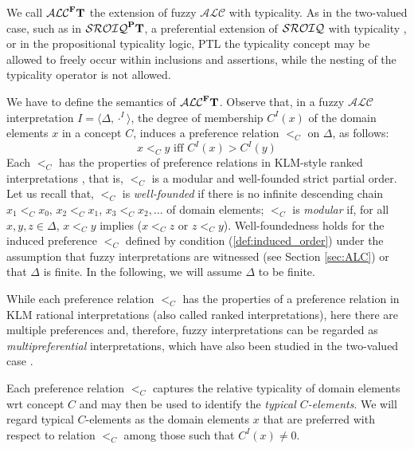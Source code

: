 \documentclass[runningheads]{llncs}
\newcommand{\tip}{{\bf T}}
\newcommand{\alc}{\mathcal{ALC}}
\newcommand{\sroiqpt}{\mathcal{SROIQ}^{\Pe}\tip}
\newcommand{\alcFt}{\mathcal{ALC}^{\Fe}\tip}
\newcommand {\Fe} {{\bf F}}
\newcommand {\Pe} {{\bf P}}
\begin{document}
We call $\alcFt$ the extension of fuzzy $\alc$ with typicality.
As in the two-valued case,  
such as in  $\sroiqpt$, a  preferential extension of ${\cal SROIQ}$ with typicality \cite{ISMIS2015},  or in the propositional typicality logic, PTL \cite{BoothCasiniAIJ19} 
the typicality concept may be allowed to freely occur within inclusions and assertions, while the nesting of the typicality operator is not allowed.

We have to define the semantics of $\alcFt$.
Observe that, in a fuzzy $\alc$ interpretation $I= \langle \Delta, \cdot^I \rangle$, the degree of membership $C^I(x)$ of the domain elements $x$ in a concept $C$, induces a preference relation $<_C$ on $\Delta$, as follows:
\begin{equation}\label{def:induced_order}
x <_C y \mbox{ iff } C^I(x) > C^I(y)
\end{equation}
Each $<_{C}$ has the properties of preference relations in KLM-style ranked interpretations \cite{whatdoes}, that is,  $<_{C}$ is a modular and well-founded strict partial order. 
Let us recall that, $<_{C}$ is {\em well-founded} 
if there is no infinite descending chain $x_1 <_C x_0$, $x_2 <_C x_1$, $x_3 <_C x_2, \ldots $ of domain elements;
    $<_{C}$ is {\em modular} if,
for all $x,y,z \in \Delta$, $x <_{C} y$ implies ($x <_{C} z$ or $z <_{C} y$).
Well-foundedness holds for the induced preference $<_C$ defined by condition (\ref{def:induced_order}) under the assumption that  fuzzy interpretations are witnessed \cite{BobilloOWL2EL2018} (see Section \ref{sec:ALC}) or that $\Delta$ is finite. 
In the following,  we will assume $\Delta$ to be finite.

While each preference relation $<_C$ has  the properties of a preference relation in KLM  rational interpretations \cite{whatdoes} (also called ranked interpretations), here there are
multiple preferences and, therefore, fuzzy interpretations can be regarded as {\em multipreferential} interpretations, which have also been studied in the two-valued case \cite{iclp2020,Delgrande2020,AIJ21}. 

Each preference relation $<_C$ captures the relative typicality of domain elements wrt concept $C$ and may then be used to identify the {\em typical  $C$-elements}. We will regard typical $C$-elements as the domain elements $x$ that  are preferred with respect to relation $<_C$
among those such that $C^I(x) \neq 0$. 
\end{document}
